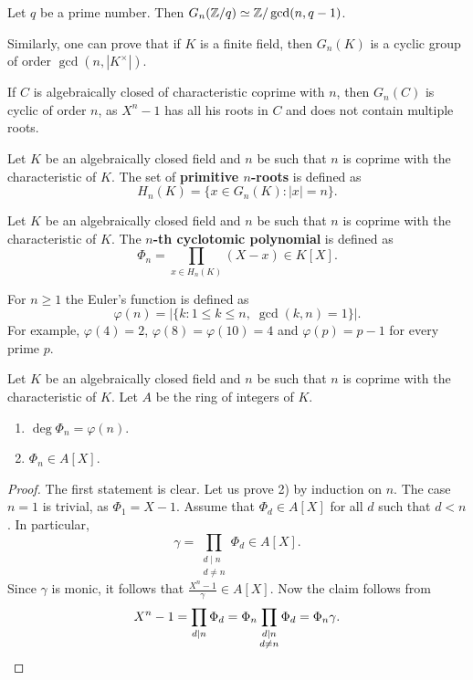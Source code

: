 \begin{exercise}
    Let $q$ be a prime number. Then $G_n(\mathbb{Z}/q)\simeq\mathbb{Z}/\gcd(n,q-1)$. 
\end{exercise}

Similarly, one can prove that if $K$ is a finite field, then $G_n(K)$ is a cyclic group
of order $\gcd(n,|K^{\times}|)$. 

\begin{example}
    If $C$ is algebraically closed of characteristic coprime with $n$, 
    then $G_n(C)$ is cyclic of order $n$, as $X^n-1$ 
    has all his roots in $C$ and does not contain multiple roots. 
\end{example}

Let $K$ be an algebraically closed field and $n$ be
such that $n$ is coprime with the characteristic of $K$. The set of 
\textbf{primitive $n$-roots} is defined as 
\[
H_n(K)=\{x\in G_n(K):|x|=n\}.
\]

\begin{definition}
    Let $K$ be an algebraically closed field and $n$ be
    such that $n$ is coprime with the characteristic of $K$. The \textbf{$n$-th cyclotomic
    polynomial} is defined as 
    \[
    \Phi_n=\prod_{x\in H_n(K)}(X-x)\in K[X].
    \]
\end{definition}

For $n\geq1$ the Euler's function is defined as 
\[
\varphi(n)=|\{k:1\leq k\leq n,\;\gcd(k,n)=1\}|.
\]
For example, $\varphi(4)=2$, $\varphi(8)=\varphi(10)=4$ and $\varphi(p)=p-1$ for every prime $p$. 

\begin{proposition}
    Let $K$ be an algebraically closed field and $n$ be
    such that $n$ is coprime with the characteristic of $K$. Let $A$ be
    the ring of integers of $K$. 
    \begin{enumerate}
        \item $\deg\Phi_n=\varphi(n)$.
        \item $\Phi_n\in A[X]$.
    \end{enumerate}
\end{proposition}

\begin{proof}
    The first statement is clear. Let us prove 2) by induction on $n$. The case $n=1$ is
    trivial, as $\Phi_1=X-1$. Assume that $\Phi_d\in A[X]$ for all $d$ such that $d<n$. 
    In particular,
    \[
    \gamma=\prod_{\substack{d\mid n\\d\ne n}}\Phi_d\in A[X].
    \]
    Since $\gamma$ is monic, it follows that 
    $\frac{X^n-1}{\gamma}\in A[X]$. Now the claim follows from 
    \[
    X^n-1=\prod_{d\mid n}\Phi_d=\Phi_n\prod_{\substack{d\mid n\\d\ne n}}\Phi_d=\Phi_n\gamma.\qedhere
    \]
\end{proof}

